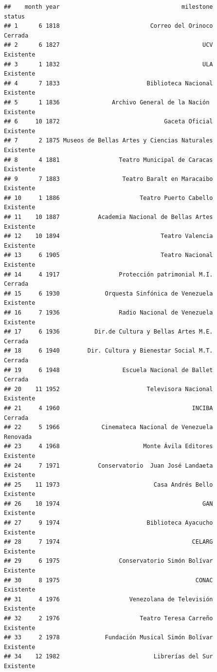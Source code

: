 \documentclass[]{article}
\begin{document}
\begin{verbatim}
##    month year                                   milestone      status
## 1      6 1818                          Correo del Orinoco     Cerrada
## 2      6 1827                                         UCV   Existente
## 3      1 1832                                         ULA   Existente
## 4      7 1833                         Biblioteca Nacional   Existente
## 5      1 1836               Archivo General de la Nación    Existente
## 6     10 1872                              Gaceta Oficial   Existente
## 7      2 1875 Museos de Bellas Artes y Ciencias Naturales   Existente
## 8      4 1881                 Teatro Municipal de Caracas   Existente
## 9      7 1883                  Teatro Baralt en Maracaibo   Existente
## 10     1 1886                       Teatro Puerto Cabello   Existente
## 11    10 1887           Academia Nacional de Bellas Artes   Existente
## 12    10 1894                             Teatro Valencia   Existente
## 13     6 1905                             Teatro Nacional   Existente
## 14     4 1917                 Protección patrimonial M.I.     Cerrada
## 15     6 1930             Orquesta Sinfónica de Venezuela   Existente
## 16     7 1936                 Radio Nacional de Venezuela   Existente
## 17     6 1936          Dir.de Cultura y Bellas Artes M.E.     Cerrada
## 18     6 1940        Dir. Cultura y Bienestar Social M.T.     Cerrada
## 19     6 1948                  Escuela Nacional de Ballet     Cerrada
## 20    11 1952                         Televisora Nacional   Existente
## 21     4 1960                                      INCIBA     Cerrada
## 22     5 1966            Cinemateca Nacional de Venezuela    Renovada
## 23     4 1968                        Monte Ávila Editores   Existente
## 24     7 1971           Conservatorio  Juan José Landaeta   Existente
## 25    11 1973                           Casa Andrés Bello   Existente
## 26    10 1974                                         GAN   Existente
## 27     9 1974                         Biblioteca Ayacucho   Existente
## 28     7 1974                                      CELARG   Existente
## 29     6 1975                 Conservatorio Simón Bolívar   Existente
## 30     8 1975                                       CONAC   Existente
## 31     4 1976                    Venezolana de Televisión   Existente
## 32     2 1976                       Teatro Teresa Carreño   Existente
## 33     2 1978             Fundación Musical Simón Bolívar   Existente
## 34    12 1982                           Librerías del Sur   Existente

\end{verbatim}
\end{document}
